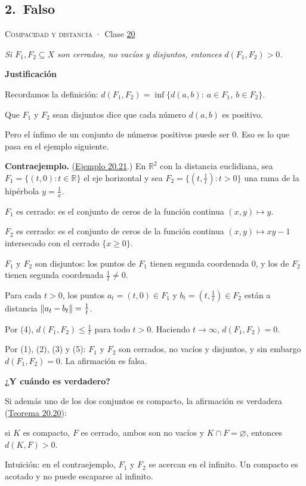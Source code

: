 \documentclass[11pt,a4paper]{article}
\newcommand{\R}{\mathbb{R}}\newcommand{\N}{\mathbb{N}}\newcommand{\Q}{\mathbb{Q}}
\newcommand{\bloque}[1]{\par\smallskip\noindent\textbf{\color{acento}#1}\par}
\begin{document}
\subsection*{\hypertarget{r-2}{}2.\ \textcolor{bad}{Falso}}
{\small \textsc{Compacidad y distancia} · Clase \href{https://decostruttivismo.github.io/MAT2514-repaso/pdf/MAT2514_apuntes_completos.pdf\#nameddest=section.20}{20}}\par
\emph{Si $F_1,F_2\subseteq X$ son cerrados, no vacíos y disjuntos, entonces $d(F_1,F_2)\gt 0$.}
\bloque{Justificación}
\begin{pasos}
\item[] Recordamos la definición: $d(F_1,F_2)=\inf\{d(a,b):\ a\in F_1,\ b\in F_2\}$.
\item[] Que $F_1$ y $F_2$ sean disjuntos dice que cada número $d(a,b)$ es positivo.
\item[] Pero el ínfimo de un conjunto de números positivos puede ser $0$. Eso es lo que pasa en el ejemplo siguiente.
\item[] \textbf{Contraejemplo.} (\href{https://decostruttivismo.github.io/MAT2514-repaso/pdf/MAT2514_apuntes_completos.pdf\#nameddest=teorema.20.21}{Ejemplo 20.21}.) En $\R^2$ con la distancia euclidiana, sea $F_1=\{(t,0):t\in\R\}$ el eje horizontal y sea $F_2=\{(t,\frac1t):t\gt 0\}$ una rama de la hipérbola $y=\frac1x$.
\item[(1)] $F_1$ es cerrado: es el conjunto de ceros de la función continua $(x,y)\mapsto y$.
\item[(2)] $F_2$ es cerrado: es el conjunto de ceros de la función continua $(x,y)\mapsto xy-1$ intersecado con el cerrado $\{x\ge0\}$.
\item[(3)] $F_1$ y $F_2$ son disjuntos: los puntos de $F_1$ tienen segunda coordenada $0$, y los de $F_2$ tienen segunda coordenada $\frac1t\neq0$.
\item[(4)] Para cada $t\gt 0$, los puntos $a_t=(t,0)\in F_1$ y $b_t=(t,\frac1t)\in F_2$ están a distancia $\lVert a_t-b_t\rVert=\frac1t$.
\item[(5)] Por (4), $d(F_1,F_2)\le\frac1t$ para todo $t\gt 0$. Haciendo $t\to\infty$, $d(F_1,F_2)=0$.
\item[] Por (1), (2), (3) y (5): $F_1$ y $F_2$ son cerrados, no vacíos y disjuntos, y sin embargo $d(F_1,F_2)=0$. La afirmación es falsa.
\end{pasos}
\bloque{¿Y cuándo es verdadero?}
\begin{pasos}
\item[] Si además uno de los dos conjuntos es compacto, la afirmación es verdadera (\href{https://decostruttivismo.github.io/MAT2514-repaso/pdf/MAT2514_apuntes_completos.pdf\#nameddest=teorema.20.20}{Teorema 20.20}):
\item[] si $K$ es compacto, $F$ es cerrado, ambos son no vacíos y $K\cap F=\varnothing$, entonces $d(K,F)\gt 0$.
\item[] Intuición: en el contraejemplo, $F_1$ y $F_2$ se acercan \guillemotleft{}en el infinito\guillemotright{}. Un compacto es acotado y no puede escaparse al infinito.
\end{pasos}
\end{document}
